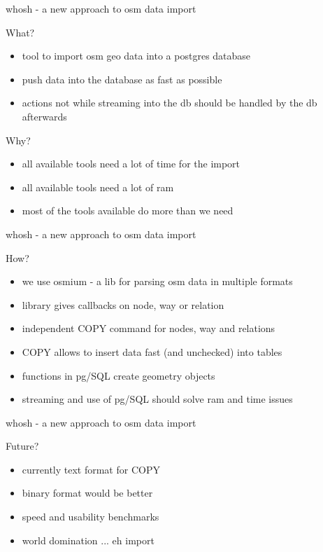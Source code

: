 \begin{frame} {whosh - a new approach to osm data import}
    \begin{block}{What?}
        \begin{itemize}
        \item tool to import osm geo data into a postgres database
        \item push data into the database as fast as possible
        \item actions not while streaming into the db should be handled by the db afterwards
        \end{itemize}
    \end{block}
    \begin{block}{Why?}
        \begin{itemize}
        \item all available tools need a lot of time for the import
        \item all available tools need a lot of ram
        \item most of the tools available do more than we need
        \end{itemize}
    \end{block}
\end{frame}

\begin{frame} {whosh - a new approach to osm data import}
    \begin{block}{How?}
        \begin{itemize}
        \item we use osmium - a lib for parsing osm data in multiple formats
        \item library gives callbacks on node, way or relation
        \item independent COPY command for nodes, way and relations
        \item COPY allows to insert data fast (and unchecked) into tables
        \item functions in pg/SQL create geometry objects
        \item streaming and use of pg/SQL should solve ram and time issues
        \end{itemize}
    \end{block}    
\end{frame}

\begin{frame} {whosh - a new approach to osm data import}
    \begin{block}{Future?}
        \begin{itemize}
        \item currently text format for COPY
        \item binary format would be better
        \item speed and usability benchmarks
        \item world domination ... eh import
        \end{itemize}
    \end{block}    
\end{frame}
